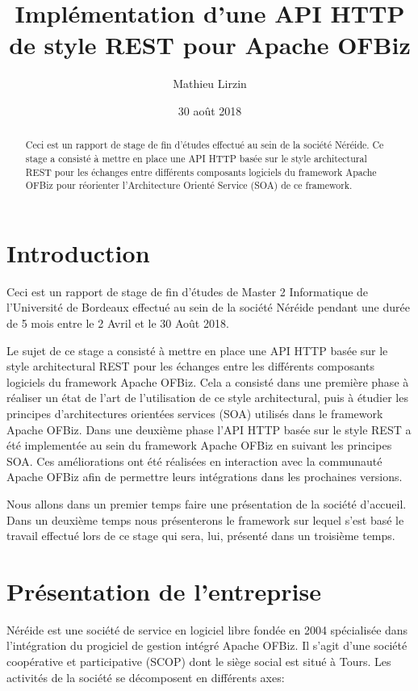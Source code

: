 \documentclass[a4paper, 11pt]{report}
\title{Implémentation d'une API HTTP de style REST pour Apache OFBiz}
\author{Mathieu Lirzin}
\date{30 août 2018}
\begin{document}
\maketitle

\begin{abstract}
  Ceci est un rapport de stage de fin d'études effectué au sein de la
  société Néréide. Ce stage a consisté à mettre en place une API HTTP
  basée sur le style architectural REST pour les échanges entre
  différents composants logiciels du framework Apache OFBiz pour
  réorienter l'Architecture Orienté Service (SOA) de ce framework.
\end{abstract}

\tableofcontents

\chapter*{Introduction}

Ceci est un rapport de stage de fin d'études de Master 2 Informatique
de l'Université de Bordeaux effectué au sein de la société Néréide
pendant une durée de 5 mois entre le 2 Avril et le 30 Août 2018.

Le sujet de ce stage a consisté à mettre en place une API HTTP basée
sur le style architectural REST pour les échanges entre les différents
composants logiciels du framework Apache OFBiz. Cela a consisté dans
une première phase à réaliser un état de l'art de l'utilisation de ce
style architectural, puis à étudier les principes d'architectures
orientées services (SOA) utilisés dans le framework Apache OFBiz.
Dans une deuxième phase l'API HTTP basée sur le style REST a été
implementée au sein du framework Apache OFBiz en suivant les principes
SOA. Ces améliorations ont été réalisées en interaction avec la
communauté Apache OFBiz afin de permettre leurs intégrations dans les
prochaines versions.

Nous allons dans un premier temps faire une présentation de la société
d'accueil. Dans un deuxième temps nous présenterons le framework sur
lequel s'est basé le travail effectué lors de ce stage qui sera, lui,
présenté dans un troisième temps.

\chapter{Présentation de l'entreprise}

Néréide est une société de service en logiciel libre fondée en 2004
spécialisée dans l'intégration du progiciel de gestion intégré Apache
OFBiz. Il s'agit d'une société coopérative et participative (SCOP)
dont le siège social est situé à Tours. Les activités de la société
se décomposent en différents axes:
\end{document}
